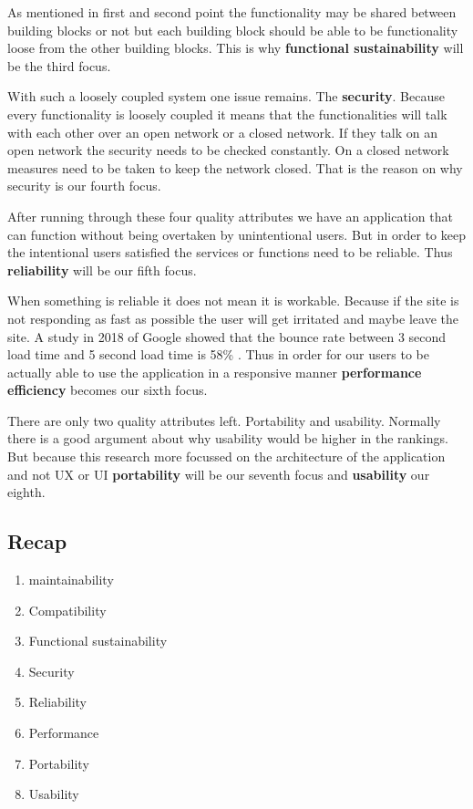As mentioned in first and second point the functionality may be shared between building blocks or not but each building block should be able to be functionality loose from the other building blocks. This is why \textbf{functional sustainability} will be the third focus.

With such a loosely coupled system one issue remains. The \textbf{security}. Because every functionality is loosely coupled it means that the functionalities will talk with each other over an open network or a closed network. If they talk on an open network the security needs to be checked constantly. On a closed network measures need to be taken to keep the network closed. That is the reason on why security is our fourth focus.

After running through these four quality attributes we have an application that can function without being overtaken by unintentional users. But in order to keep the intentional users satisfied the services or functions need to be reliable. Thus \textbf{reliability} will be our fifth focus.

When something is reliable it does not mean it is workable. Because if the site is not responding as fast as possible the user will get irritated and maybe leave the site. A study in 2018 of Google showed that the bounce rate between 3 second load time and 5 second load time is 58\% \cite{bounceRateDifference}. Thus in order for our users to be actually able to use the application in a responsive manner \textbf{performance efficiency} becomes our sixth focus.

There are only two quality attributes left. Portability and usability. Normally there is a good argument about why usability would be higher in the rankings. But because this research more focussed on the architecture of the application and not UX or UI \textbf{portability} will be our seventh focus and \textbf{usability} our eighth.

\subsection{Recap}
\label{sec:IsoRecap}

\begin{enumerate}
        \item maintainability
        \item Compatibility
        \item Functional sustainability
        \item Security
        \item Reliability
        \item Performance
        \item Portability
        \item Usability
\end{enumerate}


